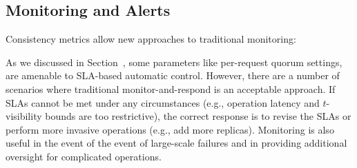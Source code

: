 \subsection{Monitoring and Alerts}
\label{sec:monitoring}

Consistency metrics allow new approaches to traditional monitoring:


As we discussed in Section~\label{sec:dynamic}, some parameters like
per-request quorum settings, are amenable to SLA-based automatic
control. However, there are a number of scenarios where traditional
monitor-and-respond is an acceptable approach. If SLAs cannot be met
under any circumstances (e.g., operation latency and $t$-visibility
bounds are too restrictive), the correct response is to revise the
SLAs or perform more invasive operations (e.g., add more
replicas). Monitoring is also useful in the event of the event of
large-scale failures and in providing additional oversight for
complicated operations.
